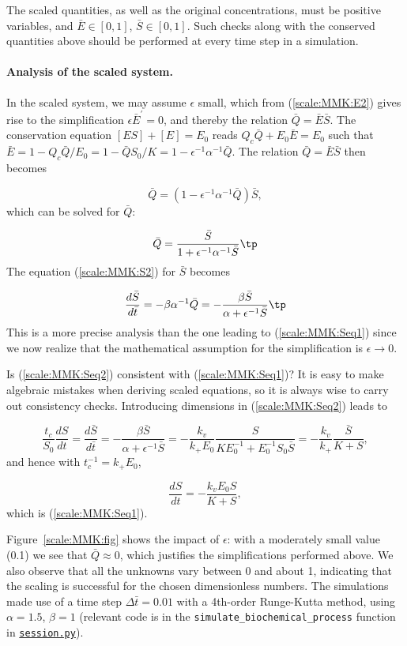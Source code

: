 \documentclass[graybox,envcountchap,sectrefs,final]{svmonodo}
\begin{document}
The scaled quantities, as well as the original concentrations, must be
positive variables, and $\bar E\in [0,1]$, $\bar S\in [0,1]$. Such checks
along with the conserved quantities above should be performed at every
time step in a simulation.

\paragraph{Analysis of the scaled system.}
In the scaled system, we may assume $\epsilon$ small, which from
(\ref{scale:MMK:E2}) gives rise to the simplification
$\epsilon\bar E^{\prime}=0$, and thereby the relation $\bar Q = \bar E\bar S$.
The conservation equation $[ES] + [E]= E_0$ reads $Q_c\bar Q + E_0\bar E =
E_0$ such that $\bar E = 1 - Q_c\bar Q/E_0=1- \bar Q S_0/K = 1 - \epsilon^{-1}\alpha^{-1}\bar Q$. The relation $\bar Q=\bar E\bar S$ then becomes

\[ \bar Q = (1 - \epsilon^{-1}\alpha^{-1}\bar Q)\bar S,\]
which can be solved for $\bar Q$:

\[ \bar Q = \frac{\bar S}{1 + \epsilon^{-1}\alpha^{-1}\bar S}\tp\]
The equation (\ref{scale:MMK:S2}) for $\bar S$ becomes

\begin{equation}
\frac{d\bar S}{d\bar t} = -\beta\alpha^{-1}\bar Q =
-\frac{\beta\bar S}{\alpha + \epsilon^{-1}\bar S}\tp
\label{scale:MMK:Seq2}
\end{equation}
This is a more precise analysis than the one leading to
(\ref{scale:MMK:Seq1}) since we now realize that the
mathematical assumption for the simplification is
$\epsilon\rightarrow 0$.

Is (\ref{scale:MMK:Seq2}) consistent with (\ref{scale:MMK:Seq1})? It is
easy to make algebraic mistakes when deriving scaled equations,
so it is always wise to carry out consistency checks.
Introducing dimensions in (\ref{scale:MMK:Seq2}) leads to

\[
\frac{t_c}{S_0}\frac{d S}{dt} =
\frac{d\bar S}{d\bar t}  =
-\frac{\beta\bar S}{\alpha + \epsilon^{-1}\bar S}
= -\frac{k_v}{k_+E_0}\frac{S}{KE_0^{-1} + E_0^{-1}S_0\bar S}
= -\frac{k_v}{k_+}\frac{\bar S}{K + S},\]
and hence with $t_c^{-1}=k_+E_0$,

\[ \frac{dS}{dt} = -\frac{k_vE_0 S}{K + S},\]
which is (\ref{scale:MMK:Seq1}).

Figure~\ref{scale:MMK:fig} shows the impact of $\epsilon$: with a moderately small
value (0.1) we see that $\bar Q\approx 0$, which justifies the
simplifications performed above. We also observe that all the unknowns
vary between 0 and about 1, indicating that the scaling is successful
for the chosen dimensionless numbers. The simulations made use of
a time step $\Delta\bar t=0.01$ with a 4th-order Runge-Kutta method,
using $\alpha=1.5$, $\beta=1$ (relevant code is in the
\Verb!simulate_biochemical_process! function in \href{{http://tinyurl.com/o8pb3yy/session.py}}{\nolinkurl{session.py}}).
\end{document}
